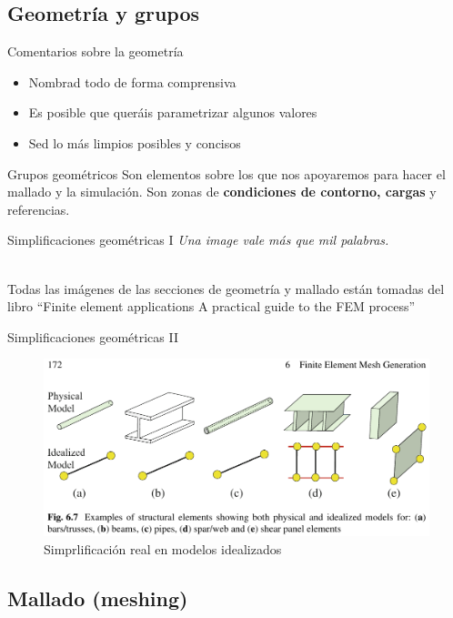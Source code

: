 \documentclass[12pt]{beamer}
\begin{document}
\subsection{Geometría y grupos}

\begin{frame}{Comentarios sobre la geometría}
	\begin{itemize}
		\item Nombrad todo de forma comprensiva
		\item Es posible que queráis parametrizar algunos valores
		\item Sed lo más limpios posibles y concisos
	\end{itemize}
	\begin{block}{Grupos geométricos}
		Son elementos sobre los que nos apoyaremos para hacer el mallado y la simulación. Son zonas de \textbf{condiciones de contorno, cargas} y referencias.
	\end{block}
\end{frame}

\begin{frame}{Simplificaciones geométricas I}
	\textit{Una image vale más que mil palabras.} \\~
	
	Todas las imágenes de las secciones de geometría y mallado están tomadas del libro ``Finite element applications A practical guide to the FEM process''	
\end{frame}

\begin{frame}{Simplificaciones geométricas II}
	\begin{figure}
		\centering
		\includegraphics[width=1\linewidth]{real_idealised_mesh}
		\caption{Simprlificación real en modelos idealizados}
		\label{fig:realidealisedmesh}
	\end{figure}
\end{frame}

\subsection{Mallado (meshing)}
\end{document}
